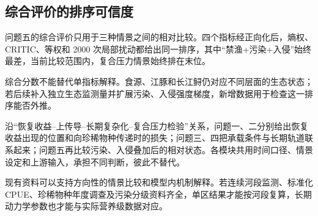 \subsection{综合评价的排序可信度}
问题五的综合评价只用于三种情景之间的相对比较。四个指标经正向化后，熵权、CRITIC、等权和 2000 次局部扰动都给出同一排序，其中“禁渔+污染+入侵”始终最差，当前比较范围内，复合压力情景始终排在末位。

综合分数不能替代单指标解释。食源、江豚和长江鲟仍对应不同层面的生态状态；若后续补入独立生态监测量并扩展污染、入侵强度梯度，新增数据用于检查这一排序能否外推。

\noindent 沿“恢复收益--上传导--长期复杂化--复合压力检验”关系，问题一、二分别给出恢复收益出现的位置和向珍稀物种传递时的损失；问题三、四把承载条件与长期轨道联系起来；问题五再比较污染、入侵叠加后的相对状态。各模块共用时间口径、情景设定和上游输入，承担不同判断，彼此不替代。

\noindent 现有资料可以支持方向性的情景比较和模型内机制解释。若连续河段监测、标准化CPUE、珍稀物种年度调查及污染分级资料齐全，单区结果才能按河段复算，长期动力学参数也才能与实际营养级数据对应。

